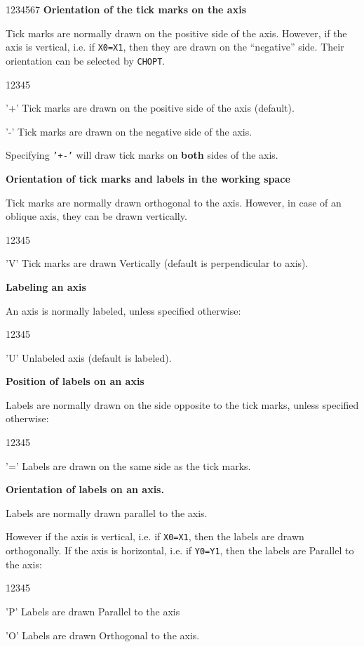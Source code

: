 \begin{DLtt}{1234567}
{\bf Orientation of the tick marks on the axis }
 
Tick marks are normally drawn on the positive side of the axis. However, if the
axis is vertical, i.e. if {\tt X0=X1}, then they are drawn on the ``negative''
side. Their orientation can be selected by {\tt CHOPT}.
\begin{DLtt}{12345}
\item['+'] Tick marks are drawn on the positive side of the axis (default).
\item['-'] Tick marks are drawn on the negative side of the axis.
\end{DLtt}
Specifying {\tt'+-'} will draw tick marks on {\bf both} sides of the axis.
 
{\bf Orientation of tick marks and labels in the working space }
 
Tick marks are normally drawn orthogonal to the axis.
However, in case of an oblique axis, they can be drawn vertically.
\begin{DLtt}{12345}
\item['V'] Tick marks are drawn Vertically (default is perpendicular to axis).
\end{DLtt}
 
{\bf Labeling an axis }
 
An axis is normally labeled, unless specified otherwise:
\begin{DLtt}{12345}
\item['U'] Unlabeled axis (default is labeled).
\end{DLtt}
 
{\bf Position of labels on an axis }
 
Labels are normally drawn on the side opposite to the tick marks,
unless specified otherwise:
\begin{DLtt}{12345}
\item['='] Labels are drawn on the same side as the tick marks.
\end{DLtt}
 
{\bf Orientation of labels on an axis. }
 
Labels are normally drawn parallel to the axis.
 
However if the axis is vertical, i.e.
if {\tt X0=X1}, then the labels are drawn
orthogonally. If the axis is horizontal, i.e. if {\tt Y0=Y1}, then the
labels are Parallel to the axis:
\begin{DLtt}{12345}
\item['P'] Labels are drawn Parallel to the axis
\item['O'] Labels are drawn Orthogonal to the axis.
\end{DLtt}
 

\end{DLtt}
